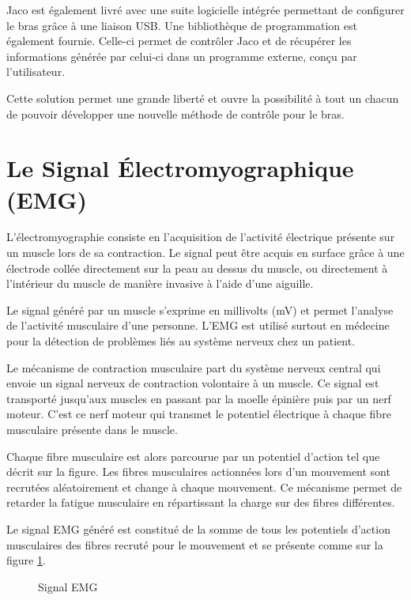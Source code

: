 \documentclass[letterpaper, twoside, 12pt, memoire, creativecommons, hyperref]{thETS}
\begin{document}
Jaco est également livré avec une suite logicielle intégrée permettant de configurer le bras grâce à une liaison USB. Une bibliothèque de programmation est également fournie. Celle-ci permet de contrôler Jaco et de récupérer les informations générée par celui-ci dans un programme externe, conçu par l'utilisateur. 

Cette solution permet une grande liberté et ouvre la possibilité à tout un chacun de pouvoir développer une nouvelle méthode de contrôle pour le bras.

\section{Le Signal Électromyographique (EMG)}

L'électromyographie consiste en l'acquisition de l'activité électrique présente sur un muscle lors de sa contraction. Le signal peut être acquis en surface grâce à une électrode collée directement sur la peau au dessus du muscle, ou directement à l'intérieur du muscle de manière invasive à l'aide d'une aiguille.

Le signal généré par un muscle s'exprime en millivolts (mV) et permet l'analyse de l'activité musculaire d'une personne. L'EMG est utilisé surtout en médecine pour la détection de problèmes liés au système nerveux chez un patient.

Le mécanisme de contraction musculaire part du système nerveux central qui envoie un signal nerveux de contraction volontaire à un muscle. Ce signal est transporté jusqu'aux muscles en passant par la moelle épinière puis par un nerf moteur. C'est ce nerf moteur qui transmet le potentiel électrique à chaque fibre musculaire présente dans le muscle. 

Chaque fibre musculaire est alors parcourue par un potentiel d'action tel que décrit sur la figure. Les fibres musculaires actionnées lors d'un mouvement sont recrutées aléatoirement et change à chaque mouvement. Ce mécanisme permet de retarder la fatigue musculaire en répartissant la charge sur des fibres différentes.

Le signal EMG généré est constitué de la somme de tous les potentiels d'action musculaires des fibres recruté pour le mouvement et se présente comme sur la figure \ref{fig:emg}.

\begin{figure}
	\centering
	\caption{Signal EMG}
	\label{fig:emg}
\end{figure}
\end{document}
